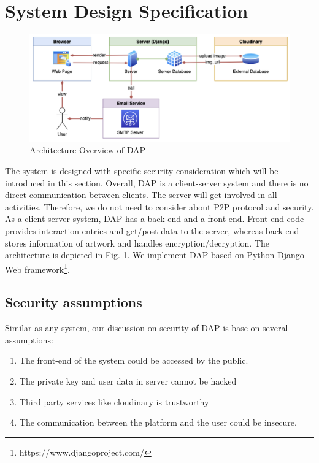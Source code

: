 \section{System Design Specification}

\begin{figure}[!h]
    \centering
    \includegraphics[scale=0.6]{figures/arch.png}
    \caption{Architecture Overview of DAP}
    \label{fig: arch}
\end{figure}

The system is designed with specific security consideration which will be introduced in this section. Overall, DAP is a client-server system and there is no direct communication between clients. The server will get involved in all activities. Therefore, we do not need to consider about P2P protocol and security. As a client-server system, DAP has a back-end and a front-end. Front-end code provides interaction entries and get/post data to the server, whereas back-end stores information of artwork and handles encryption/decryption. The architecture is depicted in Fig. \ref{fig: arch}. We implement DAP based on Python Django Web framework\footnote{https://www.djangoproject.com/}.

\subsection{Security assumptions}\label{sec:assumption}

Similar as any system, our discussion on security of DAP is base on several assumptions:
\begin{enumerate}
\item The front-end of the system could be accessed by the public.
\item The private key and user data in server cannot be hacked
\item Third party services like cloudinary is trustworthy
\item The communication between the platform and the user could be insecure.
\end{enumerate}

